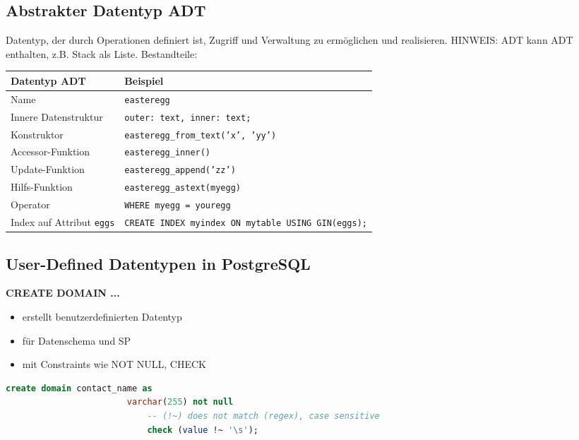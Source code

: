 \documentclass[a4paper, landscape, 8pt]{scrartcl}
\begin{document}
\begin{multicols*}{4}
        \subsection{Abstrakter Datentyp {\tiny ADT}}
        Datentyp, der durch Operationen definiert ist, Zugriff und Verwaltung zu ermöglichen und realisieren.
        HINWEIS: ADT kann ADT enthalten, z.B. Stack als Liste.
        Bestandteile:
        \begin{tabularx}{\columnwidth}{l | X}
            \textbf{Datentyp ADT} & \textbf{Beispiel} \\
            \hline
            Name & \texttt{easteregg} \\
            Innere Datenstruktur & \texttt{outer: text, inner: text;} \\
            Konstruktor & \texttt{easteregg\_from\_text('x', 'yy')} \\
            Accessor-Funktion & \texttt{easteregg\_inner()} \\
            Update-Funktion & \texttt{easteregg\_append('zz')} \\
            Hilfs-Funktion & \texttt{easteregg\_astext(myegg)} \\
            Operator & \texttt{WHERE myegg = youregg} \\
            Index auf Attribut \texttt{eggs} & \texttt{CREATE INDEX myindex ON mytable USING GIN(eggs);}
        \end{tabularx}

        \subsection{User-Defined Datentypen in PostgreSQL}
        \begin{multicols*}{2}
            \textbf{CREATE DOMAIN ...}
            \begin{itemize}
                \item erstellt benutzerdefinierten Datentyp
                \item für Datenschema und SP
                \item mit Constraints wie NOT NULL, CHECK
            \end{itemize}
            \begin{lstlisting}[language=sql]
                    create domain contact_name as
                        varchar(255) not null
                            -- (!~) does not match (regex), case sensitive
                            check (value !~ '\s');
            \end{lstlisting}


\end{multicols*}
\end{multicols*}
\end{document}
